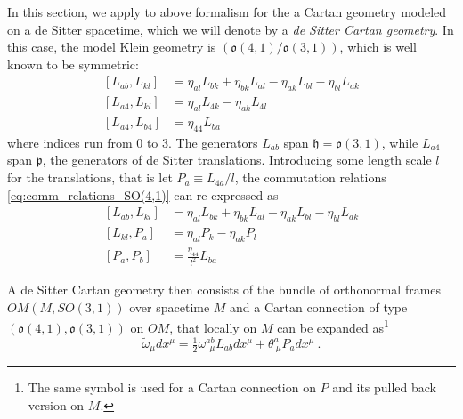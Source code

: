 \documentclass[11pt]{amsart}
\begin{document}
In this section, we apply to above formalism for the a Cartan 
geometry modeled on a de Sitter spacetime, which we will denote 
by a \emph{de Sitter Cartan geometry}. In this case, the model 
Klein geometry is $(\mathfrak{o}(4,1)/\mathfrak{o}(3,1))$, which 
is well known to be symmetric:
%
\begin{equation}
	\label{eq:comm_relations_SO(4,1)}
  \begin{split}
		[L_{ab},L_{kl}] &= \eta_{al}L_{bk} + \eta_{bk}L_{al} - 
		\eta_{ak}L_{bl} - \eta_{bl}L_{ak} \\
		[L_{a4},L_{kl}] &= \eta_{al}L_{4k} - \eta_{ak}L_{4l} \\
		[L_{a4},L_{b4}] &= \eta_{44}L_{ba}
  \end{split}
\end{equation}
where indices run from $0$ to $3$. The generators $L_{ab}$ span 
$\mathfrak{h} = \mathfrak{o}(3,1)$, while $L_{a4}$ span 
$\mathfrak{p}$, the generators of de Sitter translations.  
Introducing some length scale $l$ for the translations, that is 
let $P_a\equiv L_{4a}/l$, the commutation relations 
\eqref{eq:comm_relations_SO(4,1)} can re-expressed as
%
\begin{equation}
	\label{eq:comm_relations_SO(4,1)_length}
  \begin{split}
		[L_{ab},L_{kl}] &= \eta_{al}L_{bk} + \eta_{bk}L_{al} - 
		\eta_{ak}L_{bl} - \eta_{bl}L_{ak} \\
		[L_{kl},P_a] &= \eta_{al}P_k- \eta_{ak}P_l\\
		[P_a,P_b] &= \frac{\eta_{44}}{l^2}L_{ba}
  \end{split}
\end{equation}

A de Sitter Cartan geometry then consists of the bundle of 
orthonormal frames\linebreak[4] $OM(M,SO(3,1))$ over spacetime 
$M$ and a Cartan connection of type 
$(\mathfrak{o}(4,1),\mathfrak{o}(3,1))$ on $OM$, that locally on 
$M$ can be expanded as\footnote{The same symbol is used for a 
	Cartan connection on $P$ and its pulled back version on $M$.}
%
\begin{equation}
	\label{eq:cartan_conn_dS}
	\tilde{\omega}_\mu dx^\mu = 
	\tfrac{1}{2}\omega^{ab}_{~~\mu}L_{ab} dx^\mu + \theta^a_{~\mu} 
	P_a dx^\mu~.
\end{equation}
\end{document}
